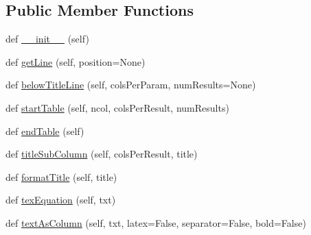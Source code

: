 \subsection*{Public Member Functions}
\begin{DoxyCompactItemize}
\item 
def \mbox{\hyperlink{classgetdist_1_1types_1_1TableFormatter_a03467618c1f6085cbbef865e5610c2b3}{\+\_\+\+\_\+init\+\_\+\+\_\+}} (self)
\item 
def \mbox{\hyperlink{classgetdist_1_1types_1_1TableFormatter_a04b0d85ebf578c2a6b3da0661fd796c5}{get\+Line}} (self, position=None)
\item 
def \mbox{\hyperlink{classgetdist_1_1types_1_1TableFormatter_afa1c1cab3c500367198430e6a9c01c9e}{below\+Title\+Line}} (self, cols\+Per\+Param, num\+Results=None)
\item 
def \mbox{\hyperlink{classgetdist_1_1types_1_1TableFormatter_a220d0544aff526844f783a67d9dea6cf}{start\+Table}} (self, ncol, cols\+Per\+Result, num\+Results)
\item 
def \mbox{\hyperlink{classgetdist_1_1types_1_1TableFormatter_a7ef55084ae5cda665dc9b6801fcfe352}{end\+Table}} (self)
\item 
def \mbox{\hyperlink{classgetdist_1_1types_1_1TableFormatter_afebe25d2181546c9dfd54e4b08b42edf}{title\+Sub\+Column}} (self, cols\+Per\+Result, title)
\item 
def \mbox{\hyperlink{classgetdist_1_1types_1_1TableFormatter_ab69b39cc3ea77c19e14235dee84964a4}{format\+Title}} (self, title)
\item 
def \mbox{\hyperlink{classgetdist_1_1types_1_1TableFormatter_a81f4a47caca6b49af53ddac530d70f81}{tex\+Equation}} (self, txt)
\item 
def \mbox{\hyperlink{classgetdist_1_1types_1_1TableFormatter_a620c7f462cff21151aa70de66d9cd85d}{text\+As\+Column}} (self, txt, latex=False, separator=False, bold=False)
\end{DoxyCompactItemize}
